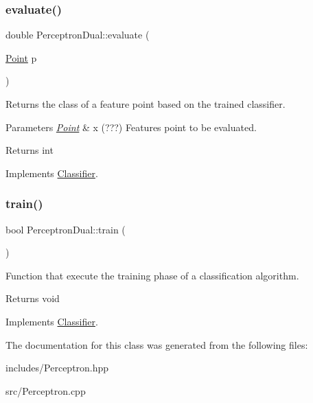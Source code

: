 \subsubsection{\texorpdfstring{evaluate()}{evaluate()}}
{\footnotesize\ttfamily double Perceptron\+Dual\+::evaluate (\begin{DoxyParamCaption}\item[{\hyperlink{class_point}{Point}}]{p }\end{DoxyParamCaption})\hspace{0.3cm}{\ttfamily [virtual]}}



Returns the class of a feature point based on the trained classifier. 


\begin{DoxyParams}{Parameters}
{\em \hyperlink{class_point}{Point}} & x (???) Features point to be evaluated. \\
\hline
\end{DoxyParams}
\begin{DoxyReturn}{Returns}
int 
\end{DoxyReturn}


Implements \hyperlink{class_classifier_ae8e9554823b85ddc2dcad2955da811d9}{Classifier}.

\mbox{\label{class_perceptron_dual_a91b0bd1e86a6003b57b96199266cdc3e}} 
\subsubsection{\texorpdfstring{train()}{train()}}
{\footnotesize\ttfamily bool Perceptron\+Dual\+::train (\begin{DoxyParamCaption}{ }\end{DoxyParamCaption})\hspace{0.3cm}{\ttfamily [virtual]}}



Function that execute the training phase of a classification algorithm. 

\begin{DoxyReturn}{Returns}
void 
\end{DoxyReturn}


Implements \hyperlink{class_classifier_a2306a5de27555ab093593ac9642bc7d9}{Classifier}.



The documentation for this class was generated from the following files\+:\begin{DoxyCompactItemize}
\item 
includes/Perceptron.\+hpp\item 
src/Perceptron.\+cpp\end{DoxyCompactItemize}
